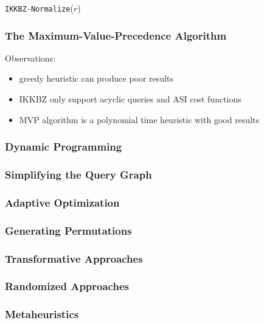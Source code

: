 \documentclass[11pt]{article}
\begin{document}
\begin{algorithm}
\caption{\texttt{IKKBZ-Normalize}(\(r\))}
\end{algorithm}
\subsubsection{The Maximum-Value-Precedence Algorithm}
\label{sec:org13e2a2f}
Observations:
\begin{itemize}
\item greedy heuristic can produce poor results
\item IKKBZ only support acyclic queries and ASI cost functions
\item MVP algorithm is a polynomial time heuristic with good results
\end{itemize}
\subsubsection{Dynamic Programming}
\label{sec:org1b758fa}
\subsubsection{Simplifying the Query Graph}
\label{sec:org7933dce}
\subsubsection{Adaptive Optimization}
\label{sec:orga062581}
\subsubsection{Generating Permutations}
\label{sec:org5ba1ae1}
\subsubsection{Transformative Approaches}
\label{sec:org6b24b3b}
\subsubsection{Randomized Approaches}
\label{sec:orgb95e1ec}
\subsubsection{Metaheuristics}
\label{sec:org3a0e956}
\end{document}
